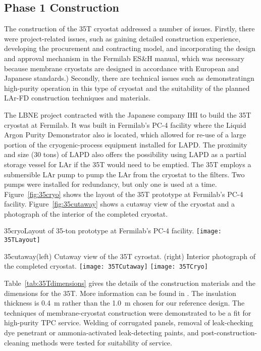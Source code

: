 \subsection{Phase 1 Construction}
The construction of the 35T cryostat addressed a number of issues.
Firstly, there were project-related issues, such as gaining detailed construction experience, 
developing the procurement and contracting model, and incorporating the design and approval mechanism 
in the Fermilab ES\&H manual, which was necessary because membrane cryostats are designed in accordance
with European and Japanese standards.)
Secondly, there are technical issues such as demonstratingn high-purity operation in this type of 
cryostat and the suitability of the planned LAr-FD construction techniques and materials.

The LBNE project contracted with the Japanese company IHI to build the 35T cryostat at Fermilab.  
It was built in Fermilab's PC-4 facility where the Liquid Argon Purity Demonstrator 
\cite{bib:lapdP07005}
also is located, which
allowed for re-use of a large portion of the cryogenic-process equipment installed for LAPD.
The proximity and size (30 tons) of LAPD also offers the possibility using LAPD as 
a partial storage vessel for LAr if the 35T would need to be emptied. The 35T employs a submersible LAr 
pump to pump the LAr from the cryostat to the filters. Two pumps were installed for redundancy, but 
only one is used at a time.
Figure~\ref{fig:35cryo} shows the layout of the 35T prototype at 
Fermilab's PC-4 facility. 
Figure~\ref{fig:35cutaway} shows a cutaway view of the cryostat and a photograph of the interior
of the completed cryostat. 

\begin{cdrfigure}{35cryo}{Layout of 35-ton prototype at Fermilab's PC-4 facility. }
\texttt{[image: 35TLayout]}
\end{cdrfigure}

\begin{cdrfigure}{35cutaway}{(left) Cutaway view of the 35T cyrostat. (right) Interior
photograph of the completed cryostat.}
\texttt{[image: 35TCutaway]}
\texttt{[image: 35TCryo]}
\end{cdrfigure}

Table~\ref{tab:35Tdimensions} gives the details of the construction materials and the
dimensions for the 35T.
More information can be found in
\cite{bib:membcryo1573}.
The insulation thickness is 0.4~m rather than the 1.0~m chosen for our reference design.  
The techniques of membrane-cryostat construction were demonstrated to be a fit 
for high-purity TPC service.
Welding of corrugated panels, removal of leak-checking dye penetrant or ammonia-activated
leak-detecting paints, and post-construction-cleaning methods were tested for suitability of service.  

